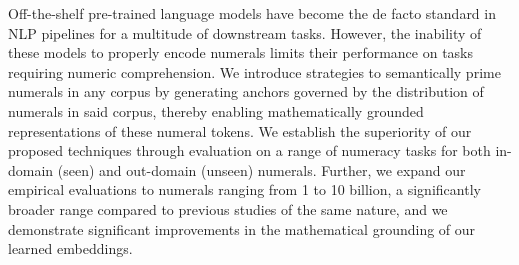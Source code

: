 Off-the-shelf pre-trained language models have become the de facto standard in NLP pipelines for a multitude of downstream tasks. However, the inability of these models to properly encode numerals limits their performance on tasks requiring numeric comprehension. We introduce strategies to semantically prime numerals in any corpus by generating anchors governed by the distribution of numerals in said corpus, thereby enabling mathematically grounded representations of these numeral tokens. We establish the superiority of our proposed techniques through evaluation on a range of numeracy tasks for both in-domain (seen) and out-domain (unseen) numerals. Further, we expand our empirical evaluations to numerals ranging from 1 to 10 billion, a significantly broader range compared to previous studies of the same nature, and we demonstrate significant improvements in the mathematical grounding of our learned embeddings.